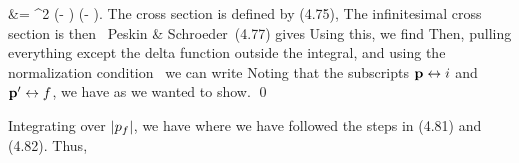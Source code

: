 {{		&= \ddcppfq {} \int \ddcppbf {} \abs{\cM}^2 \del(\Evpp - \Evp) \del(\Evpp - \Evpb).
	}
	The cross section is defined by (4.75),
	The infinitesimal cross section is then~\cite[p.~105]{Peskin}
	Peskin \& Schroeder~(4.77) gives
	Using this, we find
	Then, pulling everything except the delta function outside the integral, and using the normalization condition~\cite[pp.~102, 106]{Peskin}
	we can write
	Noting that the subscripts $\vb{p} \leftrightarrow i$ and $\vb{p}' \leftrightarrow f$, we have
	as we wanted to show. \qed
	
	Integrating over $\abs{p_f}$, we have
	where we have followed the steps in (4.81) and (4.82).  Thus,
	\vfix
}




